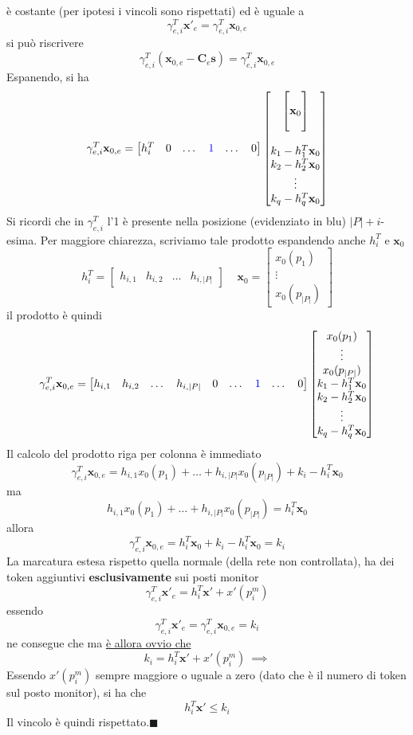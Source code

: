 \documentclass[10pt, letterpaper]{report}
\begin{document}
è costante (per ipotesi i vincoli sono rispettati) ed è uguale a 
$$ \gamma_{e,i}^T\mathbf x'_e=
\gamma_{e,i}^T\mathbf x_{0,e}
$$
si può riscrivere 
$$ \gamma_{e,i}^T(\mathbf  x_{0,e}-\mathbf C_e\mathbf s)=
\gamma_{e,i}^T\mathbf x_{0,e}
$$
Espanendo, si ha 
$$\gamma_{e,i}^T\mathbf x_{0,e}= \begin{bmatrix}
    h_i^T & 0 & \dots & \color{blue}1\color{black} & \dots & 0
\end{bmatrix}\begin{bmatrix}
    \begin{bmatrix}
        \\ \mathbf x_0 \\ \hphantom{a}
    \end{bmatrix}\\ \\
    k_1-h_1^T\mathbf x_0\\
    k_2-h_2^T\mathbf x_0\\ \vdots \\ 
    k_q-h_q^T\mathbf x_0
\end{bmatrix}$$
Si ricordi che in $\gamma_{e,i}^T$ l'1 è presente nella posizione (evidenziato in blu) $|P|+i$-esima.
Per maggiore chiarezza, scriviamo tale prodotto espandendo anche $h_i^T$ e $\mathbf x_0$
$$ h_i^T=\begin{bmatrix}
    h_{i,1} & h_{i,2} & \dots & h_{i,|P|}
\end{bmatrix} \ \ \ \ \  
\mathbf x_0=\begin{bmatrix}
    x_0(p_1)\\ \vdots \\  x_0(p_{|P|})
\end{bmatrix}
$$
il prodotto è quindi
$$ 
\gamma_{e,i}^T\mathbf x_{0,e}=
\begin{bmatrix}
    h_{i,1} & h_{i,2} & \dots & h_{i,|P|} & 0 & \dots & \color{blue}1\color{black} & \dots & 0
\end{bmatrix}\begin{bmatrix}
    x_0(p_1)\\ \vdots \\  x_0(p_{|P|}) \\
    k_1-h_1^T\mathbf x_0\\
    k_2-h_2^T\mathbf x_0\\ \vdots \\ 
    k_q-h_q^T\mathbf x_0
\end{bmatrix}
$$
Il calcolo del prodotto riga per colonna è immediato 
$$ \gamma_{e,i}^T\mathbf x_{0,e}=
h_{i,1}x_0(p_1)+ \dots + h_{i,|P|}x_0(p_{|P|})+k_i-h_i^T\mathbf x_0$$
ma $$ h_{i,1}x_0(p_1)+ \dots + h_{i,|P|}x_0(p_{|P|})=h_i^T\mathbf x_0$$
allora 
$$ \gamma_{e,i}^T\mathbf x_{0,e}=h_i^T\mathbf x_0+k_i-h_i^T\mathbf x_0=k_i$$
La marcatura estesa rispetto quella normale (della rete non controllata), ha dei token aggiuntivi \textbf{esclusivamente} sui posti monitor 
$$\gamma_{e,i}^T \mathbf x'_e=
h_i^T \mathbf x'+ x'(p_i^m)$$
essendo 
$$\gamma_{e,i}^T\mathbf x'_e=\gamma_{e,i}^T\mathbf x_{0,e}=k_i$$ ne consegue che 
ma \underline{è allora ovvio che }
$$k_i=
h_i^T \mathbf x'+ x'(p_i^m) \ \implies $$
Essendo $x'(p_i^m)$ sempre maggiore o uguale a zero (dato che è il numero di token sul posto monitor), si ha che 
$$ h_i^T \mathbf x'\le k_i$$
Il vincolo è quindi rispettato.\hfill$\blacksquare$
\end{document}
